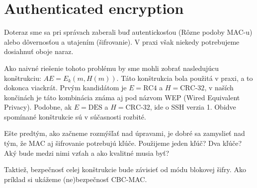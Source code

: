 \section{Authenticated encryption}

Doteraz sme sa pri správach zaberali buď autentickosťou (Rôzne podoby
MAC-u) alebo dôvernosťou a utajením (šifrovanie). V praxi však niekedy
potrebujeme dosiahnuť oboje naraz.
\begin{priklad}
    Ako naivné riešenie tohoto problému by sme mohli zobrať nasledujúcu
    konštrukciu: $AE = E_k(m, H(m))$. Táto konštrukcia bola použitá v
    praxi, a to dokonca viackrát. Prvým kandidátom je $E=\mbox{RC4}$ a
    $H=\mbox{CRC-32}$, v naších končinách je táto kombinácia známa aj pod
    názvom WEP (Wired Equivalent Privacy). Podobne, ak
    $E=\mbox{DES}$ a $H=\mbox{CRC-32}$, ide o SSH verzia 1.
    Obidve spomínané konštrukcie sú v súčasnosti rozbité.
\end{priklad}

Ešte predtým, ako začneme rozmýšľať nad úpravami, je dobré sa
zamyslieť nad tým, že MAC aj šifrovanie potrebujú kľúče. Použijeme
jeden kľúč? Dva kľúče? Aký bude medzi nimi vzťah a ako kvalitné musia
byť?

Taktiež, bezpečnosť celej konštrukcie bude závisieť od módu blokovej
šifry. Ako príklad si ukážeme (ne)bezpečnosť CBC-MAC.

